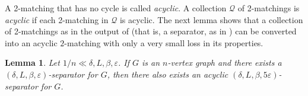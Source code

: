 \documentclass[a4paper, 11pt,reqno]{amsart}
\newcommand{\calQ}{\mathcal{Q}}
\theoremstyle{plain}
\newtheorem{lemma}[theorem]{Lemma}
\theoremstyle{definition}
\numberwithin{equation}{section}
\newcommand{\eps}{\varepsilon}
\begin{document}
A 2-matching that has no cycle is called \emph{acyclic}. A collection
$\calQ$ of 2-matchings is \emph{acyclic} if each 2-matching in $\calQ$
is acyclic.
The next lemma shows that a collection of 2-matchings as in the output
of  (that is, a separator, as in ) can be converted into an acyclic
$2$-matching with only a very small loss in its properties.

\begin{lemma}\label{lem:acyclic}
	Let $1/n \ll \delta, L, \beta, \eps$.
	If $G$ is an $n$-vertex graph and there exists a $(\delta, L,\beta,\eps)$-separator for $G$,
  then there also exists an acyclic $(\delta, L,\beta,5\eps)$-separator for $G$.
\end{lemma}
\end{document}
